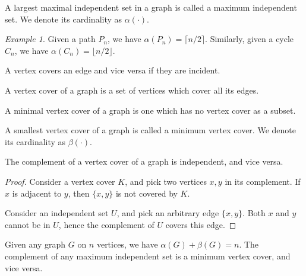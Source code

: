 \documentclass[11pt]{article}
\theoremstyle{definition}
\theoremstyle{remark}
\newtheorem*{example}{Example}
\numberwithin{equation}{section}
\begin{document}
    \begin{definition}
        A largest maximal independent set in a graph is called a maximum independent
        set. We denote its cardinality as $\alpha(\cdot)$.
    \end{definition}
    \begin{example}
        Given a path $P_n$, we have $\alpha(P_n) = \lceil n / 2\rceil$. Similarly,
        given a cycle $C_n$, we have $\alpha(C_n) = \lfloor n / 2\rfloor$.
    \end{example}

    \begin{definition}
        A vertex covers an edge and vice versa if they are incident.
    \end{definition}

    \begin{definition}
        A vertex cover of a graph is a set of vertices which cover all its edges.
    \end{definition}

    \begin{definition}
        A minimal vertex cover of a graph is one which has no vertex cover as a
        subset.
    \end{definition}

    \begin{definition}
        A smallest vertex cover of a graph is called a minimum vertex cover. We
        denote its cardinality as $\beta(\cdot)$.
    \end{definition}

    \begin{lemma}
        The complement of a vertex cover of a graph is independent, and vice versa.
    \end{lemma}
    \begin{proof}
        Consider a vertex cover $K$, and pick two vertices $x, y$ in its complement.
        If $x$ is adjacent to $y$, then $\{x, y\}$ is not covered by $K$.

        Consider an independent set $U$, and pick an arbitrary edge $\{x, y\}$. Both
        $x$ and $y$ cannot be in $U$, hence the complement of $U$ covers this edge.
    \end{proof}

    \begin{corollary}
        Given any graph $G$ on $n$ vertices, we have $\alpha(G) + \beta(G) = n$. The
        complement of any maximum independent set is a minimum vertex cover, and vice
        versa.
    \end{corollary}
    
\end{document}
